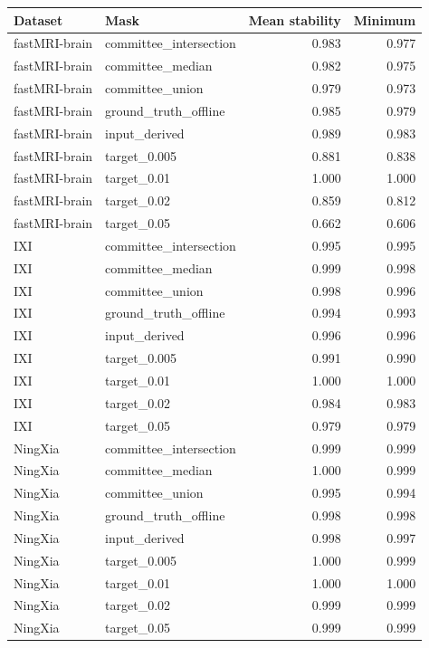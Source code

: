 \begin{tabular}{llrr}
\toprule
Dataset & Mask & Mean stability & Minimum \\
\midrule
fastMRI-brain & committee\_intersection & 0.983 & 0.977 \\
fastMRI-brain & committee\_median & 0.982 & 0.975 \\
fastMRI-brain & committee\_union & 0.979 & 0.973 \\
fastMRI-brain & ground\_truth\_offline & 0.985 & 0.979 \\
fastMRI-brain & input\_derived & 0.989 & 0.983 \\
fastMRI-brain & target\_0.005 & 0.881 & 0.838 \\
fastMRI-brain & target\_0.01 & 1.000 & 1.000 \\
fastMRI-brain & target\_0.02 & 0.859 & 0.812 \\
fastMRI-brain & target\_0.05 & 0.662 & 0.606 \\
IXI & committee\_intersection & 0.995 & 0.995 \\
IXI & committee\_median & 0.999 & 0.998 \\
IXI & committee\_union & 0.998 & 0.996 \\
IXI & ground\_truth\_offline & 0.994 & 0.993 \\
IXI & input\_derived & 0.996 & 0.996 \\
IXI & target\_0.005 & 0.991 & 0.990 \\
IXI & target\_0.01 & 1.000 & 1.000 \\
IXI & target\_0.02 & 0.984 & 0.983 \\
IXI & target\_0.05 & 0.979 & 0.979 \\
NingXia & committee\_intersection & 0.999 & 0.999 \\
NingXia & committee\_median & 1.000 & 0.999 \\
NingXia & committee\_union & 0.995 & 0.994 \\
NingXia & ground\_truth\_offline & 0.998 & 0.998 \\
NingXia & input\_derived & 0.998 & 0.997 \\
NingXia & target\_0.005 & 1.000 & 0.999 \\
NingXia & target\_0.01 & 1.000 & 1.000 \\
NingXia & target\_0.02 & 0.999 & 0.999 \\
NingXia & target\_0.05 & 0.999 & 0.999 \\
\bottomrule
\end{tabular}
